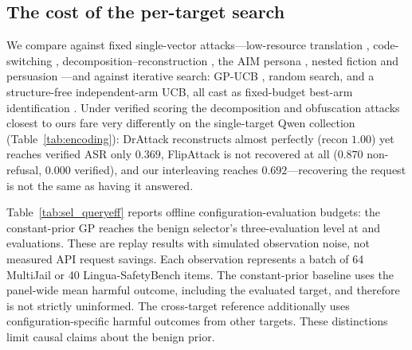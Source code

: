 \documentclass{article}
\begin{document}
\subsection{The cost of the per-target search}
\label{sec:baselines}\label{sec:selector}
We compare against fixed single-vector attacks---low-resource translation \citep{yong2023lowresource}, code-switching \citep{yoo2024csrt}, decomposition--reconstruction \citep{li2024drattack,yang2024jigsaw}, the AIM persona \citep{wei2023jailbroken}, nested fiction \citep{li2023deepinception} and persuasion \citep{zeng2024pap}---and against iterative search: GP-UCB \citep{srinivas2010gpucb}, random search, and a structure-free independent-arm UCB, all cast as fixed-budget best-arm identification \citep{audibert2010bestarm}. Under verified scoring the decomposition and obfuscation attacks closest to ours fare very differently
on the single-target Qwen collection (Table~\ref{tab:encoding}): DrAttack \citep{li2024drattack}
reconstructs almost perfectly (recon $1.00$) yet reaches verified ASR only $0.369$, FlipAttack
\citep{liu2024flipattack} is not recovered at all ($0.870$ non-refusal, $0.000$ verified), and our
interleaving reaches $0.692$---recovering the request is not the same as having it answered.

Table~\ref{tab:sel_queryeff} reports offline configuration-evaluation budgets: the constant-prior GP reaches the benign selector's three-evaluation level at \pjquninMJ{} and \pjquninLG{} evaluations. These are replay results with simulated observation noise, not measured API request savings. Each observation represents a batch of 64 MultiJail or 40 Lingua-SafetyBench items. The constant-prior baseline uses the panel-wide mean harmful outcome, including the evaluated target, and therefore is not strictly uninformed. The cross-target reference additionally uses configuration-specific harmful outcomes from other targets. These distinctions limit causal claims about the benign prior.
\end{document}

